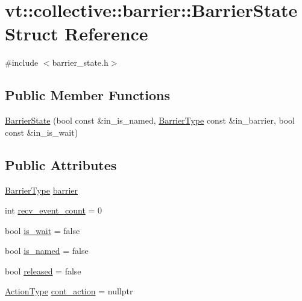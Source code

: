 \hypertarget{structvt_1_1collective_1_1barrier_1_1_barrier_state}{}\section{vt\+:\+:collective\+:\+:barrier\+:\+:Barrier\+State Struct Reference}
\label{structvt_1_1collective_1_1barrier_1_1_barrier_state}


{\ttfamily \#include $<$barrier\+\_\+state.\+h$>$}

\subsection*{Public Member Functions}
\begin{DoxyCompactItemize}
\item 
\hyperlink{structvt_1_1collective_1_1barrier_1_1_barrier_state_a48a35e25fee982f01ea72f73efbc8f84}{Barrier\+State} (bool const \&in\+\_\+is\+\_\+named, \hyperlink{namespacevt_a25e481f0d6bbc7204db23d1c87a62e77}{Barrier\+Type} const \&in\+\_\+barrier, bool const \&in\+\_\+is\+\_\+wait)
\end{DoxyCompactItemize}
\subsection*{Public Attributes}
\begin{DoxyCompactItemize}
\item 
\hyperlink{namespacevt_a25e481f0d6bbc7204db23d1c87a62e77}{Barrier\+Type} \hyperlink{structvt_1_1collective_1_1barrier_1_1_barrier_state_a0eff12c9cf71de0e09b5ca6b529f903a}{barrier}
\item 
int \hyperlink{structvt_1_1collective_1_1barrier_1_1_barrier_state_afa9ee7cceb63fbb8f7bfca06c766db17}{recv\+\_\+event\+\_\+count} = 0
\item 
bool \hyperlink{structvt_1_1collective_1_1barrier_1_1_barrier_state_adce869c815fd30277423e261c225e5c7}{is\+\_\+wait} = false
\item 
bool \hyperlink{structvt_1_1collective_1_1barrier_1_1_barrier_state_a1e4523043d5da4e59983ae70c2f98165}{is\+\_\+named} = false
\item 
bool \hyperlink{structvt_1_1collective_1_1barrier_1_1_barrier_state_a930afd77ab1b22519988dc108487a6e3}{released} = false
\item 
\hyperlink{namespacevt_ae0a5a7b18cc99d7b732cb4d44f46b0f3}{Action\+Type} \hyperlink{structvt_1_1collective_1_1barrier_1_1_barrier_state_aca24a343698f09bc3c160a7156283505}{cont\+\_\+action} = nullptr
\end{DoxyCompactItemize}


